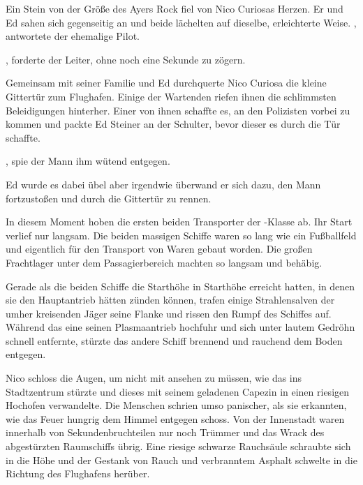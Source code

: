 Ein Stein von der Größe des Ayers Rock fiel von Nico Curiosas Herzen. Er und Ed sahen sich gegenseitig an und beide lächelten auf dieselbe, erleichterte Weise. , antwortete der ehemalige Pilot. 

\par

, forderte der Leiter, ohne noch eine Sekunde zu zögern.

\par

Gemeinsam mit seiner Familie und Ed durchquerte Nico Curiosa die kleine Gittertür zum Flughafen. Einige der Wartenden riefen ihnen die schlimmsten Beleidigungen hinterher. Einer von ihnen schaffte es, an den Polizisten vorbei zu kommen und packte Ed Steiner an der Schulter, bevor dieser es durch die Tür schaffte.

\par

, spie der Mann ihm wütend entgegen. 

\par

Ed wurde es dabei übel aber irgendwie überwand er sich dazu, den Mann fortzustoßen und durch die Gittertür zu rennen.

\par

In diesem Moment hoben die ersten beiden Transporter der -Klasse ab. Ihr Start verlief nur langsam. Die beiden massigen Schiffe waren so lang wie ein Fußballfeld und eigentlich für den Transport von Waren gebaut worden. Die großen Frachtlager unter dem Passagierbereich machten  so langsam und behäbig.

\par

Gerade als die beiden Schiffe die Starthöhe in Starthöhe erreicht hatten, in denen sie den Hauptantrieb hätten zünden können, trafen einige Strahlensalven der umher kreisenden Jäger seine Flanke und rissen den Rumpf des Schiffes auf. Während das eine seinen Plasmaantrieb hochfuhr und sich unter lautem Gedröhn schnell entfernte, stürzte das andere Schiff brennend und rauchend dem Boden entgegen.

\par

Nico schloss die Augen, um nicht mit ansehen zu müssen, wie das  ins Stadtzentrum stürzte und dieses mit seinem geladenen Capezin in einen riesigen Hochofen verwandelte. Die Menschen schrien umso panischer, als sie erkannten, wie das Feuer hungrig dem Himmel entgegen schoss. Von der Innenstadt waren innerhalb von Sekundenbruchteilen nur noch Trümmer und das Wrack des abgestürzten Raumschiffs übrig. Eine riesige schwarze Rauchsäule schraubte sich in die Höhe und der Gestank von Rauch und verbranntem Asphalt schwelte in die Richtung des Flughafens herüber.

